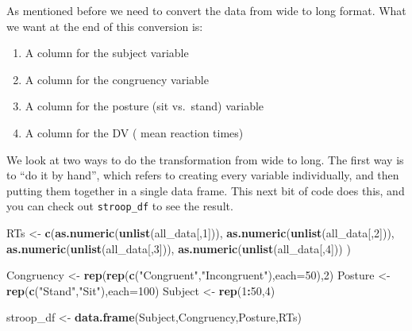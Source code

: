 \documentclass[
]{book}
\newenvironment{Shaded}{\begin{snugshade}}{\end{snugshade}}
\newcommand{\AttributeTok}[1]{\textcolor[rgb]{0.13,0.29,0.53}{#1}}
\newcommand{\DecValTok}[1]{\textcolor[rgb]{0.00,0.00,0.81}{#1}}
\newcommand{\FunctionTok}[1]{\textcolor[rgb]{0.13,0.29,0.53}{\textbf{#1}}}
\newcommand{\NormalTok}[1]{#1}
\newcommand{\OtherTok}[1]{\textcolor[rgb]{0.56,0.35,0.01}{#1}}
\newcommand{\SpecialCharTok}[1]{\textcolor[rgb]{0.81,0.36,0.00}{\textbf{#1}}}
\newcommand{\StringTok}[1]{\textcolor[rgb]{0.31,0.60,0.02}{#1}}
\providecommand{\tightlist}{%
  \setlength{\itemsep}{0pt}\setlength{\parskip}{0pt}}
\begin{document}
As mentioned before we need to convert the data from wide to long
format. What we want at the end of this conversion is:

\begin{enumerate}
\def\labelenumi{\arabic{enumi}.}
\tightlist
\item
  A column for the subject variable
\item
  A column for the congruency variable
\item
  A column for the posture (sit vs.~stand) variable
\item
  A column for the DV ( mean reaction times)
\end{enumerate}

We look at two ways to do the transformation from wide to long. The
first way is to ``do it by hand'', which refers to creating every variable
individually, and then putting them together in a single data frame.
This next bit of code does this, and you can check out \texttt{stroop\_df} to
see the result.

\begin{Shaded}
\begin{Highlighting}[]
\NormalTok{RTs }\OtherTok{\textless{}{-}} \FunctionTok{c}\NormalTok{(}\FunctionTok{as.numeric}\NormalTok{(}\FunctionTok{unlist}\NormalTok{(all\_data[,}\DecValTok{1}\NormalTok{])),}
         \FunctionTok{as.numeric}\NormalTok{(}\FunctionTok{unlist}\NormalTok{(all\_data[,}\DecValTok{2}\NormalTok{])),}
         \FunctionTok{as.numeric}\NormalTok{(}\FunctionTok{unlist}\NormalTok{(all\_data[,}\DecValTok{3}\NormalTok{])),}
         \FunctionTok{as.numeric}\NormalTok{(}\FunctionTok{unlist}\NormalTok{(all\_data[,}\DecValTok{4}\NormalTok{]))}
\NormalTok{         )}

\NormalTok{Congruency }\OtherTok{\textless{}{-}} \FunctionTok{rep}\NormalTok{(}\FunctionTok{rep}\NormalTok{(}\FunctionTok{c}\NormalTok{(}\StringTok{"Congruent"}\NormalTok{,}\StringTok{"Incongruent"}\NormalTok{),}\AttributeTok{each=}\DecValTok{50}\NormalTok{),}\DecValTok{2}\NormalTok{)}
\NormalTok{Posture }\OtherTok{\textless{}{-}} \FunctionTok{rep}\NormalTok{(}\FunctionTok{c}\NormalTok{(}\StringTok{"Stand"}\NormalTok{,}\StringTok{"Sit"}\NormalTok{),}\AttributeTok{each=}\DecValTok{100}\NormalTok{)}
\NormalTok{Subject }\OtherTok{\textless{}{-}} \FunctionTok{rep}\NormalTok{(}\DecValTok{1}\SpecialCharTok{:}\DecValTok{50}\NormalTok{,}\DecValTok{4}\NormalTok{)}

\NormalTok{stroop\_df }\OtherTok{\textless{}{-}} \FunctionTok{data.frame}\NormalTok{(Subject,Congruency,Posture,RTs)}
\end{Highlighting}
\end{Shaded}
\end{document}
